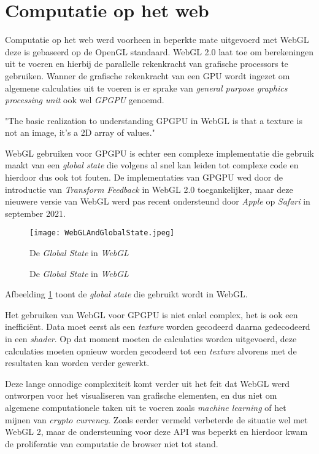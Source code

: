 \section{Computatie op het web}

Computatie op het web werd voorheen in beperkte mate uitgevoerd met WebGL deze is gebaseerd op de OpenGL standaard. WebGL 2.0 laat toe om berekeningen uit te voeren en hierbij de parallelle rekenkracht van grafische processors te gebruiken. Wanner de grafische rekenkracht van een GPU wordt ingezet om algemene calculaties uit te voeren is er sprake van \textit{general purpose graphics processing unit} ook wel \textit{GPGPU} genoemd.

\begin{displayquote}
    "The basic realization to understanding GPGPU in WebGL is that a texture is not an image, it's a 2D array of values." \autocite{Tavares2021}
\end{displayquote}

WebGL gebruiken voor GPGPU is echter een complexe implementatie die gebruik maakt van een \textit{global state} die volgens \textcite{Surma2022} al snel kan leiden tot complexe code en hierdoor dus ook tot fouten. De implementaties van GPGPU wed door de introductie van \textit{Transform Feedback} in WebGL 2.0 toegankelijker, maar deze nieuwere versie van WebGL werd pas recent ondersteund door \textit{Apple} op \textit{Safari} in september 2021.

\begin{figure}
    \texttt{[image: WebGLAndGlobalState.jpeg]}
    \caption{De \textit{Global State} in \textit{WebGL}}{De \textit{Global State} in \textit{WebGL}}
    \label{fig:WebGL Global State}
\end{figure}

\bigbreak{}

Afbeelding \ref{fig:WebGL Global State} toont de \textit{global state} die gebruikt wordt in WebGL.

\break{}

Het gebruiken van WebGL voor GPGPU is niet enkel complex, het is ook een inefficiënt. Data moet eerst als een \textit{texture} worden gecodeerd daarna gedecodeerd in een \textit{shader}. Op dat moment moeten de calculaties worden uitgevoerd, deze calculaties moeten opnieuw worden gecodeerd tot een \textit{texture} alvorens met de resultaten kan worden verder gewerkt. \autocite{Surma2022}

\bigbreak{}

Deze lange onnodige complexiteit komt verder uit het feit dat WebGL werd ontworpen voor het visualiseren van grafische elementen, en dus niet om algemene computationele taken uit te voeren zoals \textit{machine learning} of het mijnen van \textit{crypto currency}. Zoals eerder vermeld verbeterde de situatie wel met WebGL 2, maar de ondersteuning voor deze API was beperkt en hierdoor kwam de proliferatie van computatie de browser niet tot stand.

